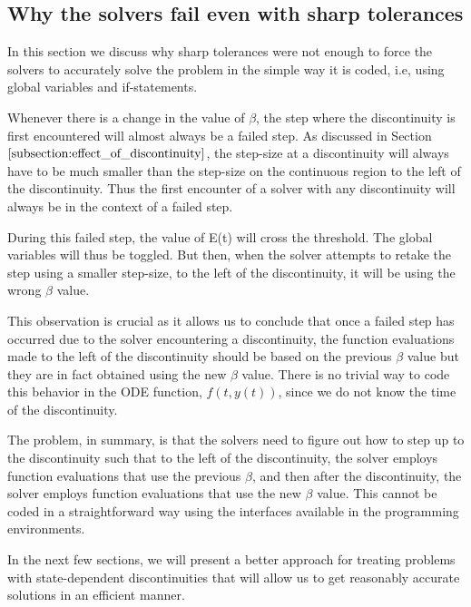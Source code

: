 \subsection{Why the solvers fail even with sharp tolerances}
\label{subsection:state_sharp_tol_failed}
In this section we discuss why sharp tolerances were not enough to force the solvers to accurately solve the problem in the simple way it is coded, i.e, using global variables and if-statements. 

Whenever there is a change in the value of $\beta$, the step where the discontinuity is first encountered will almost always be a failed step. As discussed in Section $\ref{subsection:effect_of_discontinuity}$, the step-size at a discontinuity will always have to be much smaller than the step-size on the continuous region to the left of the discontinuity. Thus the first encounter of a solver with any discontinuity will always be in the context of a failed step.

During this failed step, the value of E(t) will cross the threshold. The global variables will thus be toggled. But then, when the solver attempts to retake the step using a smaller step-size, to the left of the discontinuity, it will be using the wrong $\beta$ value. 

This observation is crucial as it allows us to conclude that once a failed step has occurred due to the solver encountering a discontinuity, the function evaluations made to the left of the discontinuity should be based on the previous $\beta$ value but they are in fact obtained using the new $\beta$ value. There is no trivial way to code this behavior in the ODE function, $f(t, y(t))$, since we do not know the time of the discontinuity. 

The problem, in summary, is that the solvers need to figure out how to step up to the discontinuity such that to the left of the discontinuity, the solver employs function evaluations that use the previous $\beta$, and then after the discontinuity, the solver employs function evaluations that use the new $\beta$ value. This cannot be coded in a straightforward way using the interfaces available in the programming environments.

In the next few sections, we will present a better approach for treating problems with state-dependent discontinuities that will allow us to get reasonably accurate solutions in an efficient manner.

